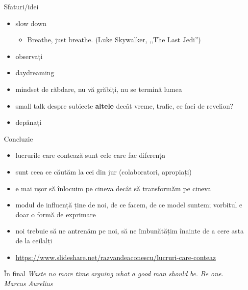 \documentclass{beamer}
\begin{document}
\begin{frame}{Sfaturi/idei}
  \begin{itemize}
    \pause \item slow down
      \begin{itemize}
        \pause \item Breathe, just breathe. (Luke Skywalker, ,,The Last Jedi'')
      \end{itemize}
    \pause \item observați
    \pause \item daydreaming
    \pause \item mindset de răbdare, nu vă grăbiți, nu se termină lumea
    \pause \item small talk despre subiecte \textbf{altele} decât vreme, trafic, ce faci de revelion?
    \pause \item depănați
  \end{itemize}
\end{frame}

\begin{frame}{Concluzie}
  \begin{itemize}
    \pause \item lucrurile care contează sunt cele care fac diferența
    \pause \item sunt ceea ce căutăm la cei din jur (colaboratori, apropiați)
    \pause \item e mai ușor să înlocuim pe cineva decât să transformăm pe cineva
    \pause \item modul de influență ține de noi, de ce facem, de ce model suntem; vorbitul e doar o formă de exprimare
    \pause \item noi trebuie să ne antrenăm pe noi, să ne îmbunătățim înainte de a cere asta de la ceilalți
    \pause \item \url{https://www.slideshare.net/razvandeaconescu/lucruri-care-conteaz}
  \end{itemize}
\end{frame}

\begin{frame}{În final}
  \pause
  \centering
  \LARGE{\textit{Waste no more time arguing what a good man should be. Be one.}} \\
  \vspace{3mm}
  \hfill \normalsize{\textit{Marcus Aurelius}} \\
\end{frame}
\end{document}
